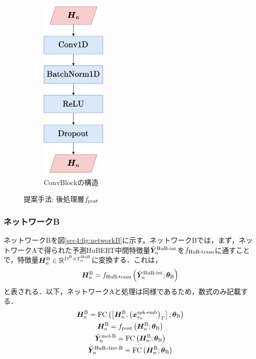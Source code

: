 \begin{figure}[tb]
\begin{subfigure}[b]{0.32\textwidth}
        \includegraphics[height=90mm]{./figure/sec4/model_2/post_convblock.drawio.png}
        \caption{$\text{ConvBlock}$の構造}
        \label{sec4:fig:post_convblock}
    \end{subfigure}
    \caption{提案手法: 後処理層$f_{\text{post}}$}
    \label{sec4:fig:post_three_step}
\end{figure}

\subsubsection{ネットワークB}
ネットワークBを図\ref{sec4:fig:networkB}に示す。ネットワークBでは，まず，ネットワークAで得られた予測HuBERT中間特徴量$\hat{\bm{Y}}^{\text{HuB-int}}_{n}$を$f_{\text{HuB-trans}}$に通すことで，特徴量$\bm{H}^{\text{B}}_{n} \in \mathbb{R}^{D^{\text{B}} \times T^{\text{HuB}}_{n}}$に変換する．これは，
\begin{equation}
    \bm{H}^{\text{B}}_{n} = f_{\text{HuB-trans}}\left(\hat{\bm{Y}}^{\text{HuB-int}}_{n}; \bm{\theta}_{\text{B}}\right)
\end{equation}
と表される．以下，ネットワークAと処理は同様であるため，数式のみ記載する．
\begin{gather}
    \bm{H}^{\text{B}}_{n} = \text{FC}\left(\left[\bm{H}^{\text{B}}_{n}, \left(\bm{x}^{\text{spk-emb}}_{s_{n}}\right)_{T}\right]; \bm{\theta}_{\text{B}}\right) \\
    \bm{H}^{\text{B}}_{n} = f_{\text{post}}\left(\bm{H}^{\text{B}}_{n}; \bm{\theta}_{\text{B}}\right) \\
    \hat{\bm{Y}}^{\text{mel-B}}_{n} = \text{FC}\left(\bm{H}^{\text{B}}_{n}; \bm{\theta}_{\text{B}}\right) \\
    \hat{\bm{Y}}^{\text{HuB-disc-B}}_{n} = \text{FC}\left(\bm{H}^{\text{B}}_{n}; \bm{\theta}_{\text{B}}\right)
\end{gather}

